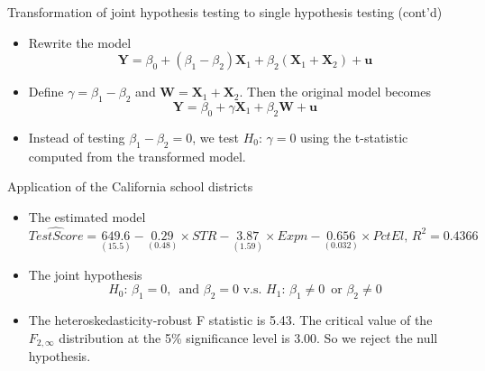 \documentclass[presentation,10pt]{beamer}
\begin{document}
\begin{frame}[label={sec:org17c0194}]{Transformation of joint hypothesis testing to single hypothesis testing (cont'd)}
\begin{itemize}
\item Rewrite the model
\begin{equation*}
\mathbf{Y} = \beta_0 + (\beta_1 - \beta_2) \mathbf{X}_1 + \beta_2 (\mathbf{X}_1 + \mathbf{X}_2) + \mathbf{u}
\end{equation*}

\item Define \(\gamma = \beta_1 - \beta_2\) and \(\mathbf{W} =
  \mathbf{X}_1 + \mathbf{X}_2\). Then the original model becomes
\[ \mathbf{Y} = \beta_0 + \gamma \mathbf{X}_1 + \beta_2
  \mathbf{W} + \mathbf{u} \]

\item Instead of testing \(\beta_1 - \beta_2 = 0\), we test \(H_0:\, \gamma
  = 0\) using the t-statistic computed from the transformed model.
\end{itemize}
\end{frame}

\begin{frame}[label={sec:orga370b71}]{Application of the California school districts}
\begin{itemize}
\item The estimated model
\begin{equation*}
\widehat{TestScore} = \underset{{\displaystyle (15.5)}}{649.6}
- \underset{\displaystyle (0.48)}{0.29} \times STR
- \underset{\displaystyle (1.59)}{3.87} \times Expn
- \underset{\displaystyle (0.032)}{0.656} \times PctEl,\, R^2 = 0.4366
\end{equation*}

\item The joint hypothesis
\[H_0:\, \beta_1 = 0,\,\text{ and } \beta_2 = 0 \text{ v.s. }
    H_1:\, \beta_1 \neq 0\,\text{ or } \beta_2 \neq 0\]

\item The heteroskedasticity-robust F statistic is 5.43. The critical
value of the \(F_{2,\infty}\) distribution at the 5\% significance
level is 3.00. So we reject the null hypothesis.
\end{itemize}
\end{frame}
\end{document}
